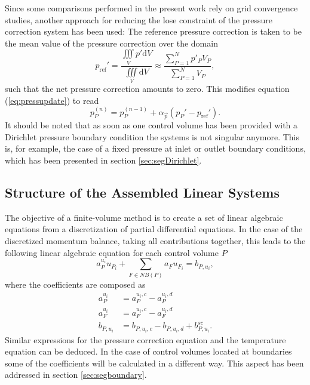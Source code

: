Since some comparisons performed in the present work rely on grid convergence studies, another approach for reducing the lose constraint of the pressure correction system has been used: The reference pressure correction is taken to be the mean value of the pressure correction over the domain 
\begin{displaymath}
  p_{\text{ref}}' 
  = \frac{\iiint\limits_V p' \mathrm{d}V}{\iiint\limits_V \mathrm{d}V} 
    \approx \frac{\sum_{P = 1}^N p'_P V_P}{\sum_{P = 1}^N V_P},
\end{displaymath}
such that the net pressure correction amounts to zero. This modifies equation (\ref{eq:pressupdate}) to read
\begin{displaymath}
  p_P^{(n)} = p_P^{(n-1)} + \alpha_{\vec{p}} \left( p_P' - p_{\text{ref}}' \right).
\end{displaymath}
It should be noted that as soon as one control volume has been provided with a Dirichlet pressure boundary condition the systems is not singular anymore. This is, for example, the case of a fixed pressure at inlet or outlet boundary conditions, which has been presented in section \ref{sec:segDirichlet}.

\subsection{Structure of the Assembled Linear Systems}
\label{sec:structure}

The objective of a finite-volume method is to create a set of linear algebraic equations from a discretization of partial differential equations. In the case of the discretized momentum balance, taking all contributions together, this leads to the following linear algebraic equation for each control volume \(P\)
\begin{displaymath}
  a_P^{u_i} u_{P_i} + \sum_{F \in NB(P)} a_F u_{F_i} = b_{P,u_i},
\end{displaymath}
where the coefficients are composed as
\begin{align*}
  a_P^{u_i} &= a_P^{u_i,c} - a_P^{u_i,d} \\
  a_F^{u_i} &= a_F^{u_i,c} - a_F^{u_i,d} \\
  b_{P,u_i} &= b_{P,u_i,c} - b_{P,u_i,d} + b_{P,u_i}^{sc}.
\end{align*}
Similar expressions for the pressure correction equation and the temperature equation can be deduced. In the case of control volumes located at boundaries some of the coefficients will be calculated in a different way. This aspect has been addressed in section \ref{sec:segboundary}.

